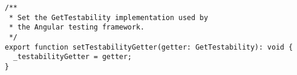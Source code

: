 \begin{verbatim}
/**
 * Set the GetTestability implementation used by
 * the Angular testing framework.
 */
export function setTestabilityGetter(getter: GetTestability): void {
  _testabilityGetter = getter;
}
\end{verbatim}
